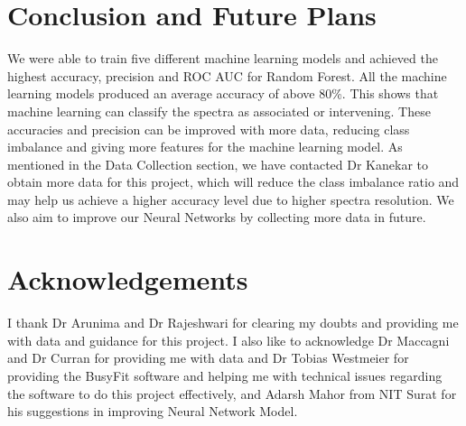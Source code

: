 \documentclass[10pt,twocolumn,letterpaper]{article}
\begin{document}
\section{Conclusion and Future Plans}

We were able to train five different machine learning models and achieved the highest accuracy, precision and ROC AUC for Random Forest. All the machine learning models produced an average accuracy of above 80\%. This shows that machine learning can classify the spectra as associated or intervening. These accuracies and precision can be improved with more data, reducing class imbalance and giving more features for the machine learning model. As mentioned in the Data Collection section, we have contacted Dr Kanekar to obtain more data for this project, which will reduce the class imbalance ratio and may help us achieve a higher accuracy level due to higher spectra resolution. We also aim to improve our Neural Networks by collecting more data in future.

\section{Acknowledgements}

I thank Dr Arunima and Dr Rajeshwari for clearing my doubts and providing me with data and guidance for this project. I also like to acknowledge Dr Maccagni and Dr Curran for providing me with data and Dr Tobias Westmeier for providing the BusyFit software and helping me with technical issues regarding the software to do this project effectively, and Adarsh Mahor from NIT Surat for his suggestions in improving Neural Network Model.



\end{document}
